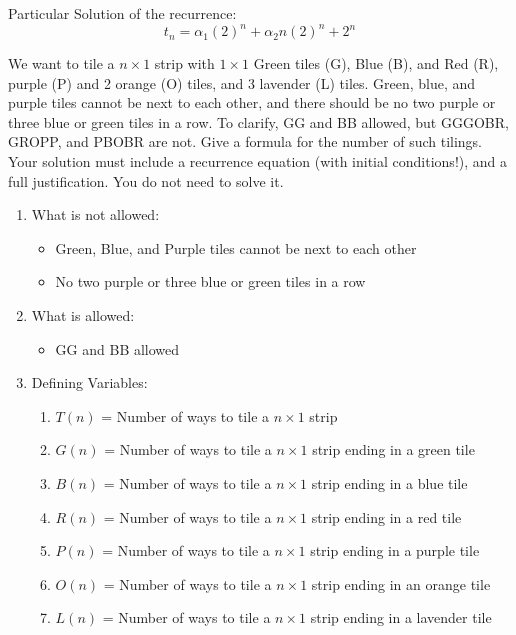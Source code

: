 \documentclass[11pt]{article}
\newcounter{prnum}
\newenvironment{problem}{{\vskip 0.2in\noindent\bf Problem
       \addtocounter{prnum}{1} \arabic{prnum}.}}{\vskip 0.1in}
\begin{document}
\begin{problem}
\begin{enumerate}[label=\alph*)]
\begin{enumerate}
          Particular Solution of the recurrence:
        \begin{equation}
          t_n = \alpha_1(2)^n + \alpha_2n(2)^n + 2^n
        \end{equation}
    \end{enumerate}
\end{enumerate}
  
\end{problem}
\pagebreak


\begin{problem}
  We want to tile a $n \times 1$ strip with $1 \times 1$ Green tiles (G), Blue (B), and Red (R),  \times{} purple (P) and 2 \times{} orange (O) tiles, and 3 \times{} lavender (L) tiles. 
  Green, blue, and purple tiles cannot be next to each other, 
  and there should be no two purple or three blue or green tiles in a row. 
  To clarify, GG and BB allowed, but GGGOBR, GROPP, and PBOBR are not.
  Give a formula for the number of such tilings. Your
  solution must include a recurrence equation (with initial conditions!), 
  and a full justification. You do not need to solve it.
\begin{enumerate}
  \item What is not allowed: 
    \begin{itemize}
      \item Green, Blue, and Purple tiles cannot be next to each other
      \item No two purple or three blue or green tiles in a row
    \end{itemize}
  \item What is allowed:
    \begin{itemize}
      \item GG and BB allowed
    \end{itemize}
  \item Defining Variables:
    \begin{enumerate}
      \item $T(n)$ = Number of ways to tile a $n \times 1$ strip
      \item $G(n)$ = Number of ways to tile a $n \times 1$ strip ending in a green tile
      \item $B(n)$ = Number of ways to tile a $n \times 1$ strip ending in a blue tile
      \item $R(n)$ = Number of ways to tile a $n \times 1$ strip ending in a red tile
      \item $P(n)$ = Number of ways to tile a $n \times 1$ strip ending in a purple tile
      \item $O(n)$ = Number of ways to tile a $n \times 1$ strip ending in an orange tile
      \item $L(n)$ = Number of ways to tile a $n \times 1$ strip ending in a lavender tile
    \end{enumerate}


\end{enumerate}
\end{problem}
\end{document}
